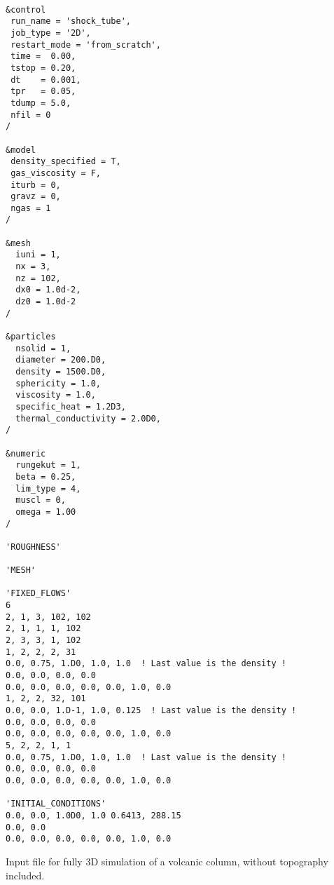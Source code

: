 \begin{verbatim}

&control
 run_name = 'shock_tube',
 job_type = '2D',
 restart_mode = 'from_scratch',
 time =  0.00,
 tstop = 0.20,
 dt    = 0.001,
 tpr   = 0.05,
 tdump = 5.0,
 nfil = 0
/

&model
 density_specified = T,
 gas_viscosity = F,
 iturb = 0,
 gravz = 0,
 ngas = 1
/

&mesh
  iuni = 1,
  nx = 3,
  nz = 102,
  dx0 = 1.0d-2,
  dz0 = 1.0d-2
/

&particles
  nsolid = 1, 
  diameter = 200.D0,
  density = 1500.D0,
  sphericity = 1.0,
  viscosity = 1.0,
  specific_heat = 1.2D3,
  thermal_conductivity = 2.0D0,
/

&numeric
  rungekut = 1,
  beta = 0.25,
  lim_type = 4,
  muscl = 0,
  omega = 1.00
/

'ROUGHNESS'

'MESH'

'FIXED_FLOWS'
6
2, 1, 3, 102, 102
2, 1, 1, 1, 102
2, 3, 3, 1, 102
1, 2, 2, 2, 31
0.0, 0.75, 1.D0, 1.0, 1.0  ! Last value is the density !
0.0, 0.0, 0.0, 0.0
0.0, 0.0, 0.0, 0.0, 0.0, 1.0, 0.0
1, 2, 2, 32, 101
0.0, 0.0, 1.D-1, 1.0, 0.125  ! Last value is the density !
0.0, 0.0, 0.0, 0.0
0.0, 0.0, 0.0, 0.0, 0.0, 1.0, 0.0
5, 2, 2, 1, 1
0.0, 0.75, 1.D0, 1.0, 1.0  ! Last value is the density !
0.0, 0.0, 0.0, 0.0
0.0, 0.0, 0.0, 0.0, 0.0, 1.0, 0.0

'INITIAL_CONDITIONS'
0.0, 0.0, 1.0D0, 1.0 0.6413, 288.15 
0.0, 0.0
0.0, 0.0, 0.0, 0.0, 0.0, 1.0, 0.0

\end{verbatim}

%
%
%
\newpage
Input file for fully 3D simulation of a volcanic column,
without topography included.

